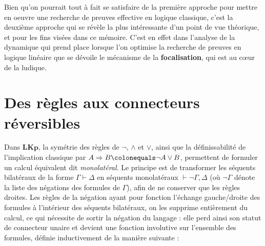 \documentclass[12pt]{report}
\newcommand{\lto}{\Rightarrow}
\newcommand{\seq}{\vdash}
\newtheorem{definition}{Définition}
\begin{document}
Bien qu'on pourrait tout à fait se satisfaire de la première approche pour mettre en oeuvre une recherche de preuves effective en logique classique, c'est la deuxième approche qui se révèle la plus intéressante d'un point de vue théorique, et pour les fins visées dans ce mémoire. C'est en effet dans l'analyse de la dynamique qui prend place lorsque l'on optimise la recherche de preuves en logique linéaire que se dévoile le mécanisme de la \textbf{focalisation}, qui est au cœur de la ludique.

\section{Des règles aux connecteurs réversibles}



Dans $\mathbf{LKp}$, la symétrie des règles de $\neg$, $\land$ et $\lor$, ainsi que la définissabilité de l'implication classique par $A \lto B \colonequals \neg A \lor B$, permettent de formuler un calcul équivalent dit \emph{monolatéral}. Le principe est de transformer les séquents bilatéraux de la forme $\Gamma \seq \Delta$ en séquents monolatéraux $\seq \neg \Gamma,\Delta$ (où $\neg \Gamma$ dénote la liste des négations des formules de $\Gamma$), afin de ne conserver que les règles droites. Les règles de la négation ayant pour fonction l'échange gauche/droite des formules à l'intérieur des séquents bilatéraux, on les supprime entièrement du calcul, ce qui nécessite de sortir la négation du langage : elle perd ainsi son statut de connecteur unaire et devient une fonction involutive sur l'ensemble des formules, définie inductivement de la manière suivante :
\end{document}
